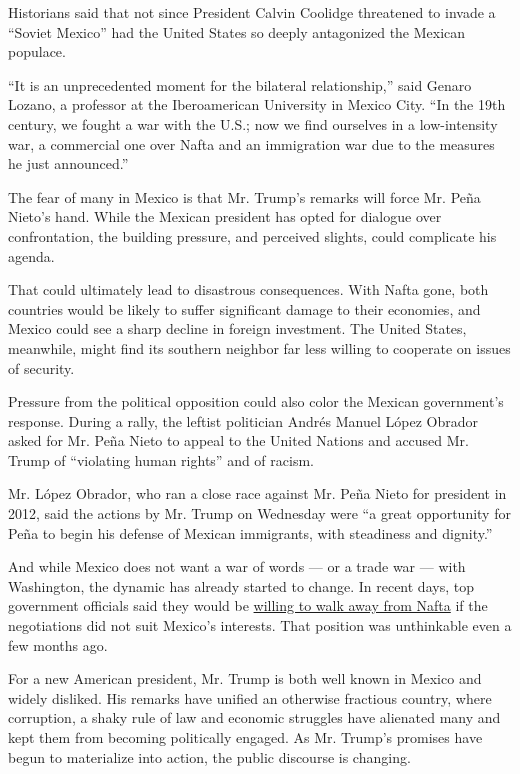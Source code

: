 Historians said that not since President Calvin Coolidge threatened to
invade a ``Soviet Mexico'' had the United States so deeply antagonized
the Mexican populace.

``It is an unprecedented moment for the bilateral relationship,'' said
Genaro Lozano, a professor at the Iberoamerican University in Mexico
City. ``In the 19th century, we fought a war with the U.S.; now we find
ourselves in a low-intensity war, a commercial one over Nafta and an
immigration war due to the measures he just announced.''

The fear of many in Mexico is that Mr. Trump's remarks will force Mr.
Peña Nieto's hand. While the Mexican president has opted for dialogue
over confrontation, the building pressure, and perceived slights, could
complicate his agenda.

That could ultimately lead to disastrous consequences. With Nafta gone,
both countries would be likely to suffer significant damage to their
economies, and Mexico could see a sharp decline in foreign investment.
The United States, meanwhile, might find its southern neighbor far less
willing to cooperate on issues of security.

Pressure from the political opposition could also color the Mexican
government's response. During a rally, the leftist politician Andrés
Manuel López Obrador asked for Mr. Peña Nieto to appeal to the United
Nations and accused Mr. Trump of ``violating human rights'' and of
racism.

Mr. López Obrador, who ran a close race against Mr. Peña Nieto for
president in 2012, said the actions by Mr. Trump on Wednesday were ``a
great opportunity for Peña to begin his defense of Mexican immigrants,
with steadiness and dignity.''

And while Mexico does not want a war of words --- or a trade war ---
with Washington, the dynamic has already started to change. In recent
days, top government officials said they would be
\href{https://www.nytimes.com/2017/01/24/world/americas/trump-mexico-nafta.html}{willing
to walk away from Nafta} if the negotiations did not suit Mexico's
interests. That position was unthinkable even a few months ago.

For a new American president, Mr. Trump is both well known in Mexico and
widely disliked. His remarks have unified an otherwise fractious
country, where corruption, a shaky rule of law and economic struggles
have alienated many and kept them from becoming politically engaged. As
Mr. Trump's promises have begun to materialize into action, the public
discourse is changing.

